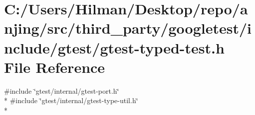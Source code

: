 \hypertarget{gtest-typed-test_8h}{}\section{C\+:/\+Users/\+Hilman/\+Desktop/repo/anjing/src/third\+\_\+party/googletest/include/gtest/gtest-\/typed-\/test.h File Reference}
\label{gtest-typed-test_8h}
{\ttfamily \#include \char`\"{}gtest/internal/gtest-\/port.\+h\char`\"{}}\\*
{\ttfamily \#include \char`\"{}gtest/internal/gtest-\/type-\/util.\+h\char`\"{}}\\*
